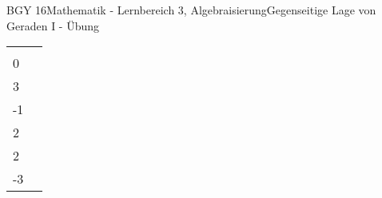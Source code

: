 \documentclass[oneside,openany,headings=optiontotoc,11pt,numbers=noenddot]{scrreprt}
\begin{document}
\begin{worksheet}{BGY 16}{Mathematik - Lernbereich 3, Algebraisierung}{Gegenseitige Lage von Geraden I - Übung}
\begin{framed}
\begin{tabularx}{\textwidth}{lX}
				& \(E: \vec{x} = \left(\begin{array}{c}2\\0\\3\end{array}\right) + r\left(\begin{array}{c}-1\\-1\\2\end{array}\right) + s\left(\begin{array}{c}1\\2\\-3\end{array}\right)\)
			\end{tabularx}
		\end{framed}
	\end{worksheet}
\end{document}
